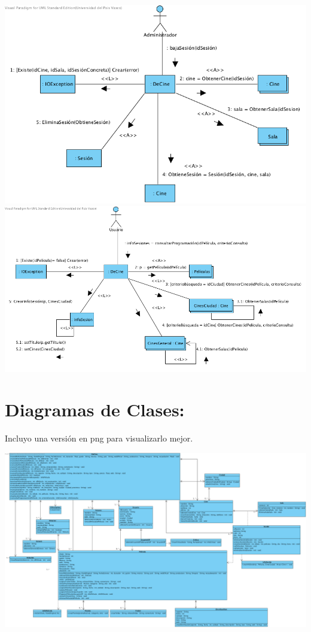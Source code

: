 \documentclass{article}
\begin{document}
\begin{center}
\includegraphics[width=1.3\linewidth]{./C-4}
\includegraphics[width=1.3\linewidth]{./C-5}
\end{center}
\section{Diagramas de Clases:}
Incluyo una versión en png para visualizarlo mejor.
\begin{center}
\includegraphics[width=1.3\linewidth]{./DiagramaClases}
\end{center}
\end{document}
